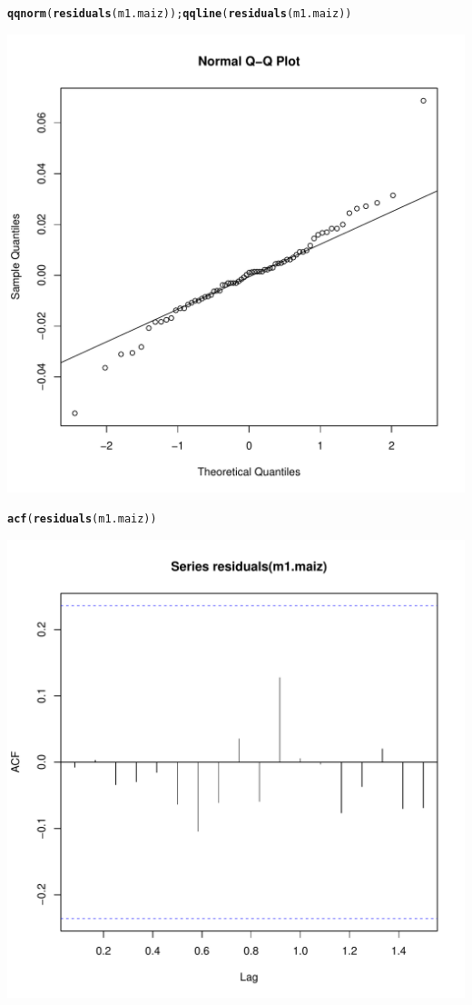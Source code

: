 \documentclass{article}\usepackage[]{graphicx}\usepackage[]{color}
\makeatletter
\def\maxwidth{ %
  \ifdim\Gin@nat@width>\linewidth
    \linewidth
  \else
    \Gin@nat@width
  \fi
}
\newcommand{\hlstd}[1]{\textcolor[rgb]{0.345,0.345,0.345}{#1}}%
\newcommand{\hlkwd}[1]{\textcolor[rgb]{0.737,0.353,0.396}{\textbf{#1}}}%
\newenvironment{kframe}{%
 \def\at@end@of@kframe{}%
 \ifinner\ifhmode%
  \def\at@end@of@kframe{\end{minipage}}%
  \begin{minipage}{\columnwidth}%
 \fi\fi%
 \def\FrameCommand##1{\hskip\@totalleftmargin \hskip-\fboxsep
 \colorbox{shadecolor}{##1}\hskip-\fboxsep
     \hskip-\linewidth \hskip-\@totalleftmargin \hskip\columnwidth}%
 \MakeFramed {\advance\hsize-\width
   \@totalleftmargin\z@ \linewidth\hsize
   \@setminipage}}%
 {\par\unskip\endMakeFramed%
 \at@end@of@kframe}
\newenvironment{knitrout}{}{} %
\makeatother
\begin{document}
\begin{knitrout}
\begin{kframe}\begin{alltt}
\hlkwd{qqnorm}\hlstd{(}\hlkwd{residuals}\hlstd{(m1.maiz));} \hlkwd{qqline}\hlstd{(}\hlkwd{residuals}\hlstd{(m1.maiz))}
\end{alltt}
\end{kframe}
\includegraphics[width=\maxwidth]{figure/unnamed-chunk-5-2} 
\begin{kframe}\begin{alltt}
\hlkwd{acf}\hlstd{(}\hlkwd{residuals}\hlstd{(m1.maiz))}
\end{alltt}
\end{kframe}
\includegraphics[width=\maxwidth]{figure/unnamed-chunk-5-3} 

\end{knitrout}
\end{document}
